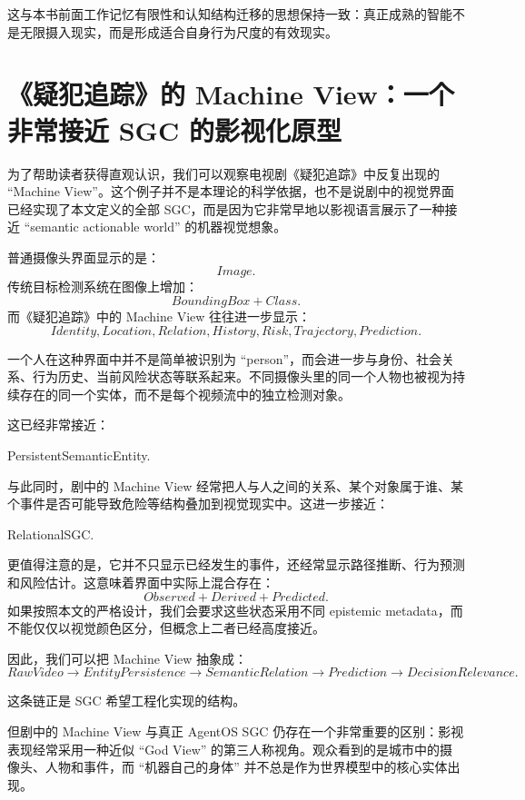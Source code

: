 这与本书前面工作记忆有限性和认知结构迁移的思想保持一致：真正成熟的智能不是无限摄入现实，而是形成适合自身行为尺度的有效现实。

\section{《疑犯追踪》的 Machine View：一个非常接近 SGC 的影视化原型}

为了帮助读者获得直观认识，我们可以观察电视剧《疑犯追踪》中反复出现的 ``Machine View''。这个例子并不是本理论的科学依据，也不是说剧中的视觉界面已经实现了本文定义的全部 SGC，而是因为它非常早地以影视语言展示了一种接近 ``semantic actionable world'' 的机器视觉想象。

普通摄像头界面显示的是：
\[
Image.
\]
传统目标检测系统在图像上增加：
\[
BoundingBox+Class.
\]
而《疑犯追踪》中的 Machine View 往往进一步显示：
\[
Identity,
Location,
Relation,
History,
Risk,
Trajectory,
Prediction.
\]

一个人在这种界面中并不是简单被识别为 ``person''，而会进一步与身份、社会关系、行为历史、当前风险状态等联系起来。不同摄像头里的同一个人物也被视为持续存在的同一个实体，而不是每个视频流中的独立检测对象。

这已经非常接近：
\begin{statementbox}
PersistentSemanticEntity.
\end{statementbox}

与此同时，剧中的 Machine View 经常把人与人之间的关系、某个对象属于谁、某个事件是否可能导致危险等结构叠加到视觉现实中。这进一步接近：
\begin{statementbox}
RelationalSGC.
\end{statementbox}

更值得注意的是，它并不只显示已经发生的事件，还经常显示路径推断、行为预测和风险估计。这意味着界面中实际上混合存在：
\[
Observed
+
Derived
+
Predicted.
\]
如果按照本文的严格设计，我们会要求这些状态采用不同 epistemic metadata，而不能仅仅以视觉颜色区分，但概念上二者已经高度接近。

因此，我们可以把 Machine View 抽象成：
\[
RawVideo
\rightarrow
EntityPersistence
\rightarrow
SemanticRelation
\rightarrow
Prediction
\rightarrow
DecisionRelevance.
\]

这条链正是 SGC 希望工程化实现的结构。

但剧中的 Machine View 与真正 AgentOS SGC 仍存在一个非常重要的区别：影视表现经常采用一种近似 ``God View'' 的第三人称视角。观众看到的是城市中的摄像头、人物和事件，而 ``机器自己的身体'' 并不总是作为世界模型中的核心实体出现。

